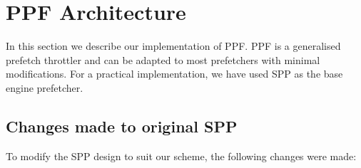 \section{PPF Architecture}
\label{Design}

In this section we describe our implementation of PPF.  PPF is a generalised
prefetch throttler and can be adapted to most prefetchers with minimal
modifications.  For a practical implementation, we have used SPP as the base
engine prefetcher.

\subsection{Changes made to original SPP}
\label{Design-Changes}
To modify the SPP design to suit our scheme, the following changes were made:

